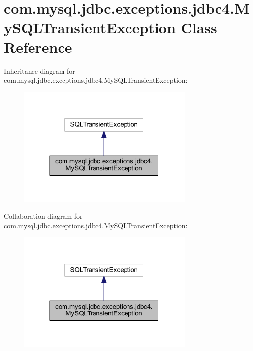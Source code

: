 \hypertarget{classcom_1_1mysql_1_1jdbc_1_1exceptions_1_1jdbc4_1_1_my_s_q_l_transient_exception}{}\section{com.\+mysql.\+jdbc.\+exceptions.\+jdbc4.\+My\+S\+Q\+L\+Transient\+Exception Class Reference}
\label{classcom_1_1mysql_1_1jdbc_1_1exceptions_1_1jdbc4_1_1_my_s_q_l_transient_exception}


Inheritance diagram for com.\+mysql.\+jdbc.\+exceptions.\+jdbc4.\+My\+S\+Q\+L\+Transient\+Exception\+:
\nopagebreak
\begin{figure}[H]
\begin{center}
\leavevmode
\includegraphics[width=245pt]{classcom_1_1mysql_1_1jdbc_1_1exceptions_1_1jdbc4_1_1_my_s_q_l_transient_exception__inherit__graph}
\end{center}
\end{figure}


Collaboration diagram for com.\+mysql.\+jdbc.\+exceptions.\+jdbc4.\+My\+S\+Q\+L\+Transient\+Exception\+:
\nopagebreak
\begin{figure}[H]
\begin{center}
\leavevmode
\includegraphics[width=245pt]{classcom_1_1mysql_1_1jdbc_1_1exceptions_1_1jdbc4_1_1_my_s_q_l_transient_exception__coll__graph}
\end{center}
\end{figure}
